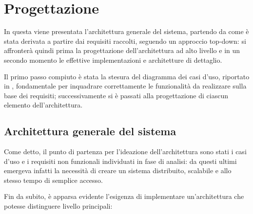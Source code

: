 \section{Progettazione}\label{sec:project}




In questa  viene presentata l'architettura generale del sistema,
partendo da come è stata derivata a partire dai requisiti raccolti, seguendo un approccio top-down:
si affronterà quindi prima la progettazione dell'architettura ad alto livello
e in un secondo momento le effettive implementazioni e architetture di dettaglio.

Il primo passo compiuto è stata la stesura del diagramma dei casi d'uso, riportato in ,
fondamentale per inquadrare correttamente le funzionalità da realizzare sulla base dei requisiti;
successivamente si è passati alla progettazione di ciascun elemento dell'architettura.

\subsection{Architettura generale del sistema}

Come detto, il punto di partenza per l'ideazione dell'architettura sono stati i casi d'uso e i requisiti non funzionali individuati in fase di analisi:
da questi ultimi emergeva infatti la necessità di creare un sistema distribuito, scalabile e allo stesso tempo di semplice accesso.

Fin da subito, è apparsa evidente l'esigenza di implementare un'architettura che potesse distinguere livello principali:

